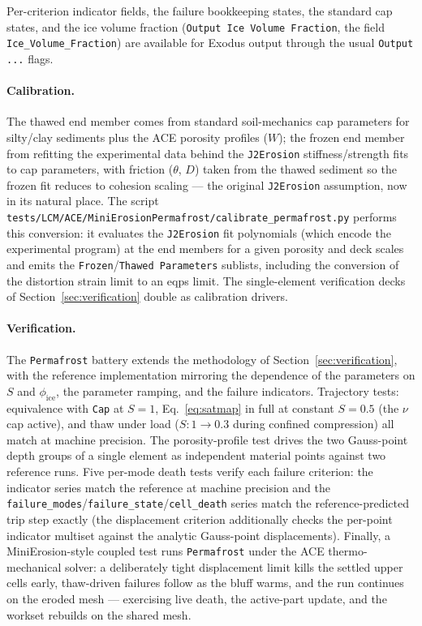 \documentclass[12pt]{article}
\begin{document}
Per-criterion indicator fields, the failure bookkeeping states, the
standard cap states, and the ice volume fraction
(\texttt{Output Ice Volume Fraction}, the field
\texttt{Ice\_Volume\_Fraction}) are available for Exodus output
through the usual \texttt{Output ...} flags.

\paragraph{Calibration.}
The thawed end member comes from standard soil-mechanics cap
parameters for silty/clay sediments plus the ACE porosity profiles
($W$); the frozen end member from refitting the experimental data
behind the \texttt{J2Erosion} stiffness/strength fits to cap
parameters, with friction ($\theta$, $D$) taken from the thawed
sediment so the frozen fit reduces to cohesion scaling --- the
original \texttt{J2Erosion} assumption, now in its natural place.
The script
\texttt{tests/LCM/ACE/MiniErosionPermafrost/calibrate\_permafrost.py}
performs this conversion: it evaluates the \texttt{J2Erosion} fit
polynomials (which encode the experimental program) at the end
members for a given porosity and deck scales and emits the
\texttt{Frozen}/\texttt{Thawed Parameters} sublists, including the
conversion of the distortion strain limit to an eqps limit. The
single-element verification decks of Section~\ref{sec:verification}
double as calibration drivers.

\paragraph{Verification.}
The \texttt{Permafrost} battery extends the methodology of
Section~\ref{sec:verification}, with the reference implementation
mirroring the dependence of the parameters on $S$ and
$\phi_{\mathrm{ice}}$, the parameter ramping, and the failure
indicators. Trajectory tests: equivalence with \texttt{Cap} at
$S = 1$, Eq.~\eqref{eq:satmap} in full at constant $S = 0.5$ (the $\nu$ cap active),
and thaw under load ($S: 1 \to 0.3$ during confined compression) all
match at machine precision. The porosity-profile test drives the two
Gauss-point depth groups of a single element as independent material
points against two reference runs. Five per-mode death tests verify
each failure criterion: the indicator series match the reference at
machine precision and the
\texttt{failure\_modes}/\texttt{failure\_state}/\texttt{cell\_death}
series match the reference-predicted trip step exactly (the
displacement criterion additionally checks the per-point indicator
multiset against the analytic Gauss-point displacements). Finally, a
MiniErosion-style coupled test runs \texttt{Permafrost} under the
ACE thermo-mechanical solver: a deliberately tight displacement
limit kills the settled upper cells early, thaw-driven failures
follow as the bluff warms, and the run continues on the eroded mesh
--- exercising live death, the active-part update, and the workset
rebuilds on the shared mesh.
\end{document}
